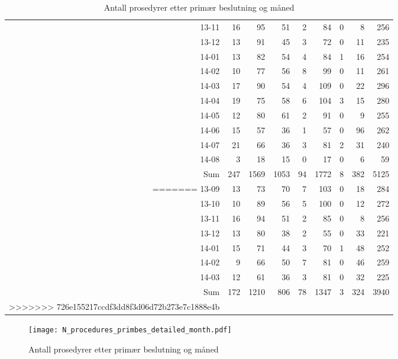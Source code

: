 \documentclass[presentation,xcolor=pdftex,dvipsnames,table]{beamer}
\begin{document}
\begin{frame}
\begin{tiny}
\begin{table}[ht]
\begin{tabular}{rrrrrrrrr}
  13-11 & 16 & 95 & 51 & 2 & 84 & 0 & 8 & 256 \\ 
  13-12 & 13 & 91 & 45 & 3 & 72 & 0 & 11 & 235 \\ 
  14-01 & 13 & 82 & 54 & 4 & 84 & 1 & 16 & 254 \\ 
  14-02 & 10 & 77 & 56 & 8 & 99 & 0 & 11 & 261 \\ 
  14-03 & 17 & 90 & 54 & 4 & 109 & 0 & 22 & 296 \\ 
  14-04 & 19 & 75 & 58 & 6 & 104 & 3 & 15 & 280 \\ 
  14-05 & 12 & 80 & 61 & 2 & 91 & 0 & 9 & 255 \\ 
  14-06 & 15 & 57 & 36 & 1 & 57 & 0 & 96 & 262 \\ 
  14-07 & 21 & 66 & 36 & 3 & 81 & 2 & 31 & 240 \\ 
  14-08 & 3 & 18 & 15 & 0 & 17 & 0 & 6 & 59 \\ 
  Sum & 247 & 1569 & 1053 & 94 & 1772 & 8 & 382 & 5125 \\ 
=======
  13-09 & 13 & 73 & 70 & 7 & 103 & 0 & 18 & 284 \\ 
  13-10 & 10 & 89 & 56 & 5 & 100 & 0 & 12 & 272 \\ 
  13-11 & 16 & 94 & 51 & 2 & 85 & 0 & 8 & 256 \\ 
  13-12 & 13 & 80 & 38 & 2 & 55 & 0 & 33 & 221 \\ 
  14-01 & 15 & 71 & 44 & 3 & 70 & 1 & 48 & 252 \\ 
  14-02 & 9 & 66 & 50 & 7 & 81 & 0 & 46 & 259 \\ 
  14-03 & 12 & 61 & 36 & 3 & 81 & 0 & 32 & 225 \\ 
  Sum & 172 & 1210 & 806 & 78 & 1347 & 3 & 324 & 3940 \\ 
>>>>>>> 726e155217ccdf3dd8f3d06d72b273e7c1888e4b
   \bottomrule
\end{tabular}
\caption{Antall prosedyrer etter primær beslutning og måned} 
\end{table}\end{tiny}
\end{frame}




\begin{frame}
\begin{figure}
  \centering
  \caption{Antall prosedyrer etter primær beslutning og måned}
\texttt{[image: N\_procedures\_primbes\_detailed\_month.pdf]}
\end{figure}\end{frame}
\end{document}
